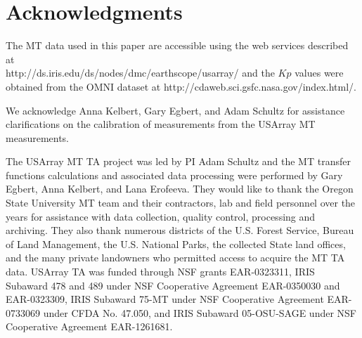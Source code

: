 \documentclass[linenumbers,draft]{agujournal}
\begin{document}
\section{Acknowledgments}

The MT data used in this paper are accessible using the web services described at \\http://ds.iris.edu/ds/nodes/dmc/earthscope/usarray/ and the $Kp$ values were obtained from the OMNI dataset at http://cdaweb.sci.gsfc.nasa.gov/index.html/.

We acknowledge Anna Kelbert, Gary Egbert, and Adam Schultz for assistance clarifications on the calibration of measurements from the USArray MT measurements.

The USArray MT TA project was led by PI Adam Schultz and the MT transfer functions calculations and associated data processing were performed by Gary Egbert, Anna Kelbert, and Lana Erofeeva.  They would like to thank the Oregon State University MT team and their contractors, lab and field personnel over the years for assistance with data collection, quality control, processing and archiving. They also thank numerous districts of the U.S. Forest Service, Bureau of Land Management, the U.S. National Parks, the collected State land offices, and the many private landowners who permitted access to acquire the MT TA data. USArray TA was funded through NSF grants EAR-0323311, IRIS Subaward 478 and 489 under NSF Cooperative Agreement EAR-0350030 and EAR-0323309, IRIS Subaward 75-MT under NSF Cooperative Agreement EAR-0733069 under CFDA No. 47.050, and IRIS Subaward 05-OSU-SAGE under NSF Cooperative Agreement EAR-1261681.

\clearpage
\end{document}
